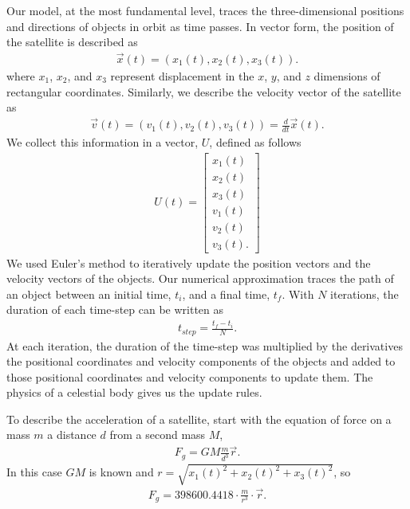 \documentclass[12pt]{scrartcl}
\begin{document}
Our model, at the most fundamental level, traces the three-dimensional positions and directions of objects in orbit as time passes. In vector form, the position of the satellite is described as
\begin{align}
\vec{x}(t) = (x_1(t), x_2(t), x_3(t)).
\end{align}
where $x_1$, $x_2$, and $x_3$ represent displacement in the $x$, $y$, and $z$ dimensions of rectangular coordinates. Similarly, we describe the velocity vector of the satellite as
\begin{align}
\vec{v}(t) = (v_1(t), v_2(t), v_3(t)) = \frac{d}{dt} \vec{x}(t).
\end{align}
We collect this information in a vector, $U$, defined as follows
\begin{align}
U(t) = 
\left[\begin{array}{c} 
x_1(t) \\ 
x_2(t) \\ 
x_3(t) \\
v_1(t) \\
v_2(t) \\
v_3(t).
\end{array}\right]
\end{align}
We used Euler's method to iteratively update the position vectors and the velocity vectors of the objects. Our numerical approximation traces the path of an object between an initial time, $t_{i}$, and a final time, $t_{f}$. With $N$ iterations, the duration of each time-step can be written as 
\begin{align}
t_{\mathit{step}} = \frac{t_{f} - t_{i}}{N}.
\end{align}
At each iteration, the duration of the time-step was multiplied by the derivatives the positional coordinates and velocity components of the objects and added to those positional coordinates and velocity components to update them. The physics of a celestial body gives us the update rules.

To describe the acceleration of a satellite, start with the equation of force on a mass \(m\) a distance \(d\) from a second mass \(M\), 
\begin{align}
F_{g} = GM \frac{m}{d^3} \vec{r}.
\end{align} 
In this case \(GM\) is known and \(r=\sqrt{x_1(t)^2+x_2(t)^2+x_3(t)^2}\), so
\begin{align}
F_{g} = 398600.4418 \cdot \frac{m}{r^3} \cdot \vec{r}.
\end{align}
\end{document}
